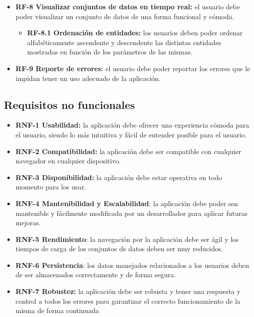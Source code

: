 \begin{itemize}
    \item \textbf{RF-8 Visualizar conjuntos de datos en tiempo real:} el usuario debe poder visualizar un conjunto de datos de una forma funcional y cómoda.
    \begin{itemize}
        \item \textbf{RF-8.1 Ordenación de entidades:} los usuarios deben poder ordenar alfabéticamente ascendente y descendente las distintas entidades mostradas en función de los parámetros de las mismas.
    \end{itemize}

    \item \textbf{RF-9 Reporte de errores:} el usuario debe poder reportar los errores que le impidan tener un uso adecuado de la aplicación.
    
\end{itemize}

\subsection{\textbf{Requisitos no funcionales}}

\begin{itemize}
\tightlist
\item
    \textbf{RNF-1 Usabilidad:} la aplicación debe ofrecer una experiencia cómoda para el usuario, siendo lo más intuitiva y fácil de entender posible para el usuario.
\item
    \textbf{RNF-2 Compatibilidad:} la aplicación debe ser compatible con cualquier navegador en cualquier dispositivo.
\item
    \textbf{RNF-3 Disponibilidad:} la aplicación debe estar operativa en todo momento para los usar.
\item
    \textbf{RNF-4 Mantenibilidad y Escalabilidad}: la aplicación debe poder sen mantenible y fácilmente modificada por un desarrollador para aplicar futuras mejoras.
\item
    \textbf{RNF-5 Rendimiento}: la navegación por la aplicación debe ser ágil y los tiempos de carga de los conjuntos de datos deben ser muy reducidos.
\item
    \textbf{RNF-6 Persistencia}: los datos manejados relacionados a los usuarios deben de ser almacenados correctamente y de forma segura.
\item
    \textbf{RNF-7 Robustez:} la aplicación debe ser robusta y tener una respuesta y control a todos los errores para garantizar el correcto funcionamiento de la misma de forma continuada
\end{itemize}

